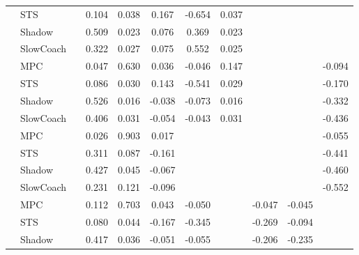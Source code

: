 \begin{tabular}{|l|l|*{9}{c|}}
                                                           & STS &       &     0.104 &     0.038 &  0.167 & -0.654 &  0.037 &      &      &       \\
                                                           & Shadow &       &     0.509 &     0.023 &  0.076 &  0.369 &  0.023 &      &      &       \\
                                                           & SlowCoach &       &     0.322 &     0.027 &  0.075 &  0.552 &  0.025 &      &      &       \\
\midrule
[False, True, True, True, True, True, False, False, True] & MPC &       &     0.047 &     0.630 &  0.036 & -0.046 &  0.147 &      &      &   -0.094 \\
                                                           & STS &       &     0.086 &     0.030 &  0.143 & -0.541 &  0.029 &      &      &   -0.170 \\
                                                           & Shadow &       &     0.526 &     0.016 & -0.038 & -0.073 &  0.016 &      &      &   -0.332 \\
                                                           & SlowCoach &       &     0.406 &     0.031 & -0.054 & -0.043 &  0.031 &      &      &   -0.436 \\
\midrule
[False, True, True, True, False, False, False, False, True] & MPC &       &     0.026 &     0.903 &  0.017 &     &     &      &      &   -0.055 \\
                                                           & STS &       &     0.311 &     0.087 & -0.161 &     &     &      &      &   -0.441 \\
                                                           & Shadow &       &     0.427 &     0.045 & -0.067 &     &     &      &      &   -0.460 \\
                                                           & SlowCoach &       &     0.231 &     0.121 & -0.096 &     &     &      &      &   -0.552 \\
\midrule
[False, True, True, True, True, False, True, True, False] & MPC &       &     0.112 &     0.703 &  0.043 & -0.050 &     &  -0.047 &  -0.045 &       \\
                                                           & STS &       &     0.080 &     0.044 & -0.167 & -0.345 &     &  -0.269 &  -0.094 &       \\
                                                           & Shadow &       &     0.417 &     0.036 & -0.051 & -0.055 &     &  -0.206 &  -0.235 &       \\

\end{tabular}
